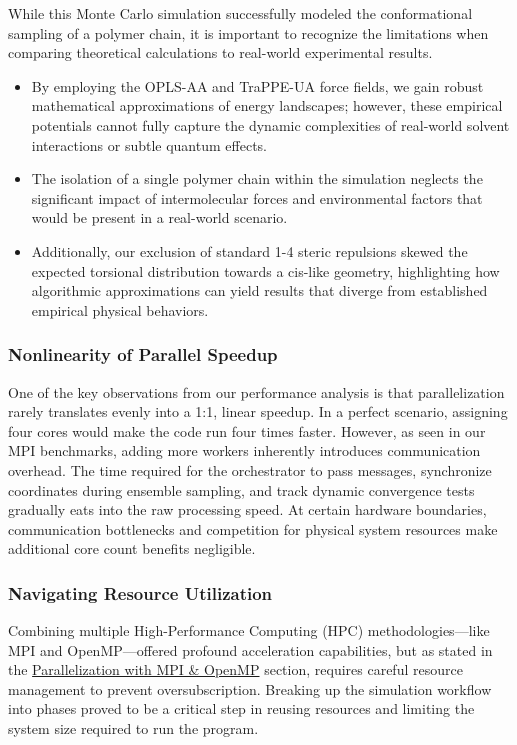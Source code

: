 \documentclass[
]{article}
\providecommand{\tightlist}{%
  \setlength{\itemsep}{0pt}\setlength{\parskip}{0pt}}
\begin{document}
While this Monte Carlo simulation successfully modeled the
conformational sampling of a polymer chain, it is important to recognize
the limitations when comparing theoretical calculations to real-world
experimental results.

\begin{itemize}
\tightlist
\item
  By employing the OPLS-AA and TraPPE-UA force fields, we gain robust
  mathematical approximations of energy landscapes; however, these
  empirical potentials cannot fully capture the dynamic complexities of
  real-world solvent interactions or subtle quantum effects.
\item
  The isolation of a single polymer chain within the simulation neglects
  the significant impact of intermolecular forces and environmental
  factors that would be present in a real-world scenario.
\item
  Additionally, our exclusion of standard 1-4 steric repulsions skewed
  the expected torsional distribution towards a cis-like geometry,
  highlighting how algorithmic approximations can yield results that
  diverge from established empirical physical behaviors.
\end{itemize}

\subsubsection{Nonlinearity of Parallel
Speedup}\label{nonlinearity-of-parallel-speedup}

One of the key observations from our performance analysis is that
parallelization rarely translates evenly into a 1:1, linear speedup. In
a perfect scenario, assigning four cores would make the code run four
times faster. However, as seen in our MPI benchmarks, adding more
workers inherently introduces communication overhead. The time required
for the orchestrator to pass messages, synchronize coordinates during
ensemble sampling, and track dynamic convergence tests gradually eats
into the raw processing speed. At certain hardware boundaries,
communication bottlenecks and competition for physical system resources
make additional core count benefits negligible.

\subsubsection{Navigating Resource
Utilization}\label{navigating-resource-utilization}

Combining multiple High-Performance Computing (HPC) methodologies---like
MPI and OpenMP---offered profound acceleration capabilities, but as
stated in the
\href{./EIA_Project2026_Report_GroupII.md\#parallelization-with-mpi--openmp}{Parallelization
with MPI \& OpenMP} section, requires careful resource management to
prevent oversubscription. Breaking up the simulation workflow into
phases proved to be a critical step in reusing resources and limiting
the system size required to run the program.
\end{document}
